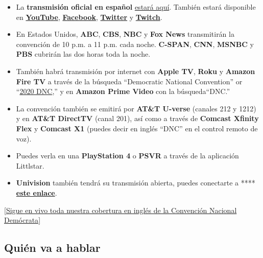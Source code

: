 \begin{itemize}
\item
  La \textbf{transmisión oficial en español}
  \href{https://www.demconvention.com/es/vea-la-convencion/}{estará
  aquí}. También estará disponible en
  \textbf{\href{http://www.youtube.com/demconvention}{YouTube}},
  \textbf{\href{http://www.facebookcorewwwi.onion/demconvention}{Facebook}},
  \textbf{\href{http://www.twitter.com/demconvention}{Twitter}} y
  \textbf{\href{https://www.twitch.tv/demconvention}{Twitch}}.
\item
  En Estados Unidos, \textbf{ABC}, \textbf{CBS}, \textbf{NBC} y
  \textbf{Fox News} transmitirán la convención de 10 p.m. a 11 p.m. cada
  noche. \textbf{C-SPAN}, \textbf{CNN}, \textbf{MSNBC} y \textbf{PBS}
  cubrirán las dos horas toda la noche.
\item
  También habrá transmisión por internet con \textbf{Apple TV},
  \textbf{Roku} y \textbf{Amazon Fire TV} a través de la búsqueda
  ``Democratic National Convention'' or
  ``\href{https://www.nytimes3xbfgragh.onion/article/the-dnc-explained.html}{2020
  DNC},'' y en \textbf{Amazon Prime Video} con la búsqueda``DNC.''
\item
  La convención también se emitirá por \textbf{AT\&T U-verse} (canales
  212 y 1212) y en \textbf{AT\&T DirectTV} (canal 201), así como a
  través de \textbf{Comcast Xfinity Flex} y \textbf{Comcast X1} (puedes
  decir en inglés ``DNC'' en el control remoto de voz).
\item
  Puedes verla en una \textbf{PlayStation 4} o \textbf{PSVR} a través de
  la aplicación Littlstar.
\item
  \textbf{Univision} también tendrá su transmisión abierta, puedes
  conectarte a ****
  \textbf{\href{https://www.facebookcorewwwi.onion/watch/live/?v=665159337449198\&ref=watch_permalink}{este
  enlace}}.
\end{itemize}

\href{https://nytimes3xbfgragh.onion/news-event/2020-election}{{[}Sigue
en vivo toda nuestra cobertura en inglés de la Convención Nacional
Demócrata{]}}

\hypertarget{quiuxe9n-va-a-hablar}{%
\subsection{Quién va a hablar}\label{quiuxe9n-va-a-hablar}}

